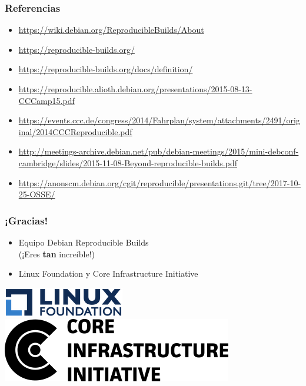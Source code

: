 \documentclass[14pt,aspectratio=169]{beamer}
\begin{document}
\begin{frame}
 \frametitle{Referencias}

 \begin{itemize}
  \item \url{https://wiki.debian.org/ReproducibleBuilds/About}
  \item \url{https://reproducible-builds.org/}
  \item \url{https://reproducible-builds.org/docs/definition/}
  \item \url{https://reproducible.alioth.debian.org/presentations/2015-08-13-CCCamp15.pdf}
  \item \url{https://events.ccc.de/congress/2014/Fahrplan/system/attachments/2491/original/2014CCCReproducible.pdf}
  \item \url{http://meetings-archive.debian.net/pub/debian-meetings/2015/mini-debconf-cambridge/slides/2015-11-08-Beyond-reproducible-builds.pdf}
  \item \url{https://anonscm.debian.org/cgit/reproducible/presentations.git/tree/2017-10-25-OSSE/}
  
 \end{itemize}
\end{frame}

\begin{frame}
 \frametitle{¡Gracias!}

 \begin{itemize}
  \item Equipo Debian Reproducible Builds \\
        {\small (¡Eres \textbf{tan} increíble!)}
  \item Linux Foundation y Core Infrastructure Initiative
\end{itemize}

 \begin{center}
  \includegraphics[height=0.1\paperheight]{images/linux_foundation_logo.png}
  \hspace{0.1\paperwidth}
  \includegraphics[height=0.1\paperheight]{images/cii_logo.png}
 \end{center}

 \vfill
 \begin{center}
 \end{center}
\end{frame}
\end{document}
